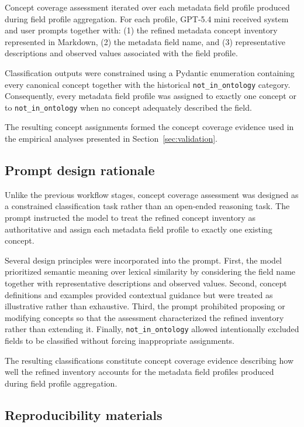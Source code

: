 \documentclass{article}
\begin{document}
Concept coverage assessment iterated over each metadata field profile produced during field profile aggregation. For each profile, GPT-5.4 mini received system and user prompts together with: (1) the refined metadata concept inventory represented in Markdown, (2) the metadata field name, and (3) representative descriptions and observed values associated with the field profile.

Classification outputs were constrained using a Pydantic enumeration containing every canonical concept together with the historical \texttt{not\_in\_ontology} category. Consequently, every metadata field profile was assigned to exactly one concept or to \texttt{not\_in\_ontology} when no concept adequately described the field.

The resulting concept assignments formed the concept coverage evidence used in the empirical analyses presented in Section~\ref{sec:validation}.

\subsection{Prompt design rationale}

Unlike the previous workflow stages, concept coverage assessment was designed as a constrained classification task rather than an open-ended reasoning task. The prompt instructed the model to treat the refined concept inventory as authoritative and assign each metadata field profile to exactly one existing concept.

Several design principles were incorporated into the prompt. First, the model prioritized semantic meaning over lexical similarity by considering the field name together with representative descriptions and observed values. Second, concept definitions and examples provided contextual guidance but were treated as illustrative rather than exhaustive. Third, the prompt prohibited proposing or modifying concepts so that the assessment characterized the refined inventory rather than extending it. Finally, \texttt{not\_in\_ontology} allowed intentionally excluded fields to be classified without forcing inappropriate assignments.

The resulting classifications constitute concept coverage evidence describing how well the refined inventory accounts for the metadata field profiles produced during field profile aggregation.

\subsection{Reproducibility materials}
\end{document}
